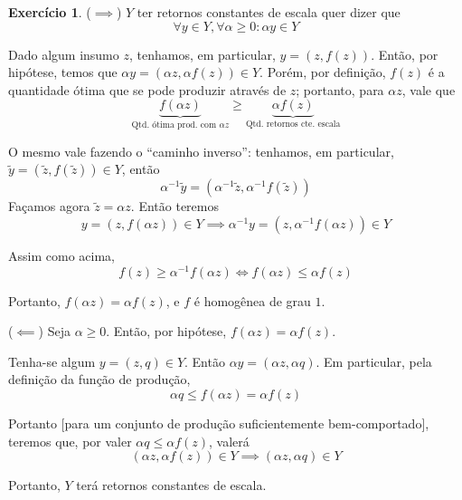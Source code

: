 \documentclass[12pt]{article}
\numberwithin{equation}{section}
\theoremstyle{plain}
\theoremstyle{definition}
\newtheorem{exercise}{Exercício}
\theoremstyle{remark}
\begin{document}
\begin{exercise}
(\(\implies\)) \(Y\) ter retornos constantes de escala quer dizer que
\[
\forall y \in Y, \forall \alpha\geq 0: \alpha y \in Y
\]

Dado algum insumo \(z\), tenhamos, em particular, \(y=(z, f(z))\).
Então, por hipótese, temos que
\(\alpha y=(\alpha z, \alpha f(z)) \in Y\). Porém, por definição,
\(f(z)\) é a quantidade ótima que se pode produzir através de \(z\);
portanto, para \(\alpha z\), vale que
\[
\underbrace{ f(\alpha z) }_{ \text{Qtd. ótima prod. com } \alpha z } \geq\underbrace{ \alpha f(z) }_{ \text{Qtd. retornos cte. escala} }
\]

O mesmo vale fazendo o ``caminho inverso'': tenhamos, em particular,
\(\tilde{y} = (\tilde{z}, f(\tilde{z})) \in Y\), então
\[
\alpha^{-1}\tilde{y} = (\alpha^{-1}\tilde{z}, \alpha^{-1}f(\tilde{z}))
\]
Façamos agora \(\tilde{z}=\alpha z\). Então teremos
\[
y = (z, f(\alpha z)) \in Y \implies \alpha^{-1} y = (z, \alpha^{-1}f(\alpha z)) \in Y
\]

Assim como acima,
\[
f(z)\geq \alpha^{-1}f(\alpha z)  \iff f(\alpha z) \leq \alpha f(z)
\]

Portanto, \(f(\alpha z) = \alpha f(z)\), e \(f\) é homogênea de grau
\(1\).

(\(\impliedby\)) Seja \(\alpha\geq 0\). Então, por hipótese,
\(f(\alpha z)=\alpha f(z)\).

Tenha-se algum \(y = (z, q) \in Y\). Então
\(\alpha y=(\alpha z, \alpha q)\). Em particular, pela definição da
função de produção,
\[
\alpha q\leq f(\alpha z) = \alpha f(z)
\]

Portanto {[}para um conjunto de produção suficientemente
bem-comportado{]}, teremos que, por valer \(\alpha q \leq \alpha f(z)\),
valerá
\[
(\alpha z, \alpha f(z)) \in Y \implies (\alpha z,\alpha q) \in Y
\]

Portanto, \(Y\) terá retornos constantes de escala.
\end{exercise}
\end{document}
